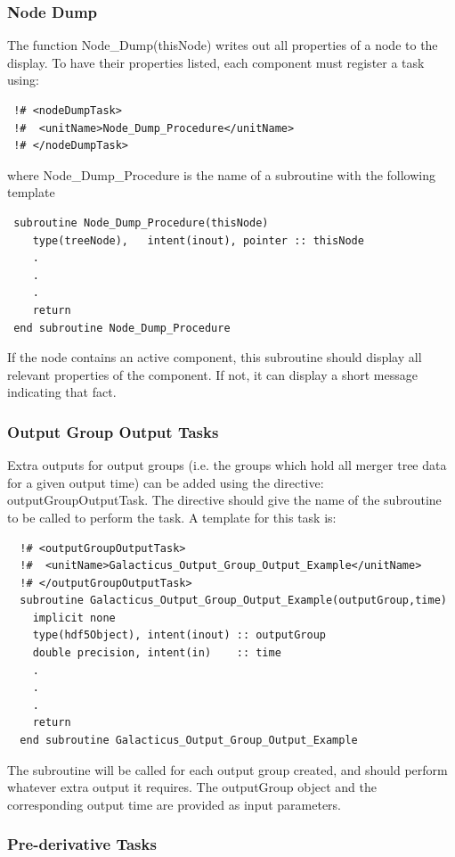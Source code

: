 \subsubsection{Node Dump}

The function {\normalfont \ttfamily Node\_Dump(thisNode)} writes out all properties of a node to the display. To have their properties listed, each component must register a task using:
\begin{verbatim}
 !# <nodeDumpTask>
 !#  <unitName>Node_Dump_Procedure</unitName>
 !# </nodeDumpTask>
\end{verbatim}
where {\normalfont \ttfamily Node\_Dump\_Procedure} is the name of a subroutine with the following template
\begin{verbatim}
 subroutine Node_Dump_Procedure(thisNode)
    type(treeNode),   intent(inout), pointer :: thisNode
    .
    .
    .
    return
 end subroutine Node_Dump_Procedure
\end{verbatim}
If the node contains an active component, this subroutine should display all relevant properties of the component. If not, it can display a short message indicating that fact.

\subsubsection{Output Group Output Tasks}

Extra outputs for output groups (i.e. the groups which hold all merger tree data for a given output time) can be added using the directive: {\normalfont \ttfamily outputGroupOutputTask}. The directive should give the name of the subroutine to be called to perform the task. A template for this task is:
\begin{verbatim}
  !# <outputGroupOutputTask>
  !#  <unitName>Galacticus_Output_Group_Output_Example</unitName>
  !# </outputGroupOutputTask>
  subroutine Galacticus_Output_Group_Output_Example(outputGroup,time)
    implicit none
    type(hdf5Object), intent(inout) :: outputGroup
    double precision, intent(in)    :: time
    .
    .
    .
    return
  end subroutine Galacticus_Output_Group_Output_Example
\end{verbatim}
The subroutine will be called for each output group created, and should perform whatever extra output it requires. The {\normalfont \ttfamily outputGroup} object and the corresponding output {\normalfont \ttfamily time} are provided as input parameters.

\subsubsection{Pre-derivative Tasks}

